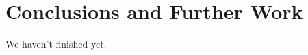 \documentclass[../main.tex]{subfiles}
\begin{document}
\chapter{Conclusions and Further Work}
We haven't finished yet.
\end{document}
